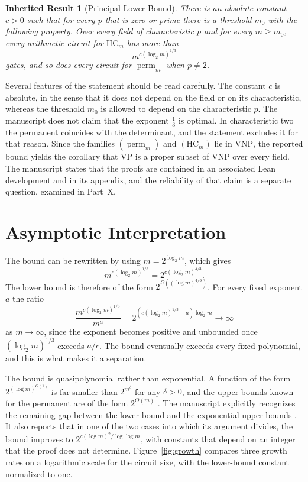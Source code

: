 \documentclass[11pt,letterpaper]{report}
\theoremstyle{plain}
\newtheorem{inherited}[theorem]{Inherited Result}
\theoremstyle{definition}
\theoremstyle{remark}
\DeclareMathOperator{\perm}{perm}
\newcommand{\VP}{\mathrm{VP}}
\newcommand{\VNP}{\mathrm{VNP}}
\begin{document}
\begin{inherited}[Principal Lower Bound]\label{rep:main}
There is an absolute constant $c>0$ such that for every $p$ that is zero or prime there is a threshold $m_0$ with the following property. Over every field of characteristic $p$ and for every $m\geq m_0$, every arithmetic circuit for $\mathrm{HC}_m$ has more than
\[
m^{c(\log_2 m)^{1/3}}
\]
gates, and so does every circuit for $\perm_m$ when $p\neq2$.
\end{inherited}

Several features of the statement should be read carefully. The constant $c$ is absolute, in the sense that it does not depend on the field or on its characteristic, whereas the threshold $m_0$ is allowed to depend on the characteristic $p$. The manuscript does not claim that the exponent $\tfrac13$ is optimal. In characteristic two the permanent coincides with the determinant, and the statement excludes it for that reason. Since the families $(\perm_m)$ and $(\mathrm{HC}_m)$ lie in $\VNP$, the reported bound yields the corollary that $\VP$ is a proper subset of $\VNP$ over every field. The manuscript states that the proofs are contained in an associated Lean development and in its appendix, and the reliability of that claim is a separate question, examined in Part~X.

\section{Asymptotic Interpretation}

The bound can be rewritten by using $m=2^{\log_2 m}$, which gives
\[
m^{c(\log_2 m)^{1/3}}
=2^{c(\log_2 m)^{4/3}}.
\]
The lower bound is therefore of the form $2^{\Omega((\log m)^{4/3})}$. For every fixed exponent $a$ the ratio
\[
\frac{
m^{c(\log_2 m)^{1/3}}
}{
m^a
}
=
2^{\left(c(\log_2 m)^{1/3}-a\right)\log_2 m}
\longrightarrow\infty
\]
as $m\to\infty$, since the exponent becomes positive and unbounded once $(\log_2 m)^{1/3}$ exceeds $a/c$. The bound eventually exceeds every fixed polynomial, and this is what makes it a separation.

The bound is quasipolynomial rather than exponential. A function of the form $2^{(\log m)^{O(1)}}$ is far smaller than $2^{m^{\delta}}$ for any $\delta>0$, and the upper bounds known for the permanent are of the form $2^{O(m)}$ \cite{Ryser1963,Glynn2010}. The manuscript explicitly recognizes the remaining gap between the lower bound and the exponential upper bounds \cite{Source2026}. It also reports that in one of the two cases into which its argument divides, the bound improves to $2^{c(\log m)^2/\log\log m}$, with constants that depend on an integer that the proof does not determine. Figure~\ref{fig:growth} compares three growth rates on a logarithmic scale for the circuit size, with the lower-bound constant normalized to one.
\end{document}
